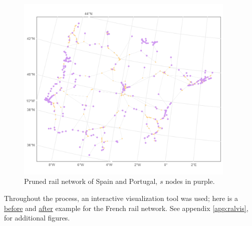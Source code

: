\begin{figure}[htbp]
  \centering
  \includegraphics[width=10.5cm,keepaspectratio]{images/Spain_and_portugal_pruned.png}
  \caption{Pruned rail network of Spain and Portugal, $s$ nodes in purple.}

\end{figure}

Throughout the process, an interactive visualization tool was used; here is a 
\href{https://ale-neri-137.github.io/PoCN_project/french_rail_before.html}{before} and 
\href{https://ale-neri-137.github.io/PoCN_project/french_rail_after.html}{after} example for the French rail network. See appendix \ref{app:ralvis}, for additional figures.

 




\newpage
